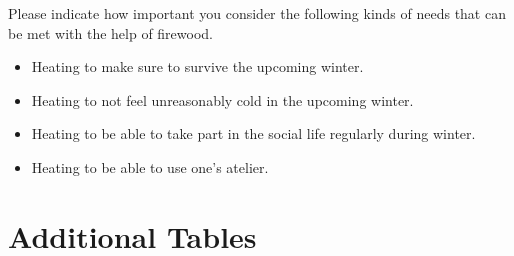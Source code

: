 \documentclass[egregdoesnotlikesansseriftitles]{scrartcl}
\begin{document}
\noindent Please indicate how important you consider the following kinds of needs that can be met with the help of firewood.
\begin{itemize}
   \item Heating to make sure to survive the upcoming winter.
   \item Heating to not feel unreasonably cold in the upcoming winter.
   \item Heating to be able to take part in the social life regularly during winter.
   \item Heating to be able to use one's atelier.
\end{itemize}


\clearpage
\section{Additional Tables}\label{sec:app_tables}
\end{document}

